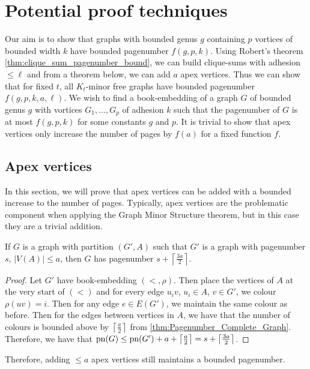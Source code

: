 
\chapter{Potential proof techniques}\label{chap:Proving_The_Theorem}
Our aim is to show that graphs with bounded genus \(g\) containing \(p\) vortices of bounded width \(k\) have bounded pagenumber \(f(g, p, k)\).
Using Robert's theorem \cref{thm:clique_sum_pagenumber_bound}, we can build clique-sums with adhesion \(\leq \ell\) and from a theorem below, we can add \(a\) apex vertices. 
Thus we can show that for fixed \(t\), all \(K_t\)-minor free graphs have bounded pagenumber \(f(g, p, k, a, \ell)\). 
We wish to find a book-embedding of a graph \(G\) of bounded genus \(g\) with vortices \(G_1, \ldots, G_p\) of adhesion \(k\) such that the pagenumber of \(G\) is at most \(f(g, p, k)\) for some constants \(g\) and \(p\). It is trivial to show that apex vertices only increase the number of pages by \(f(a)\) for a fixed function \(f\). 
\section{Apex vertices}
In this section, we will prove that apex vertices can be added with a bounded increase to the number of pages. Typically, apex vertices are the problematic component when applying the Graph Minor Structure theorem, but in this case they are a trivial addition.
\begin{theorem}
	If \(G\) is a graph with partition \((G', A)\) such that \(G'\) is a graph with pagenumber \(s\), \(|V(A)| \leq a\), then \(G\) has pagenumber \(s + \left\lceil \frac{3a}{2}\right\rceil\). 
\end{theorem}
\begin{proof}
	Let \(G'\) have book-embedding \((<, \rho)\). Then place the vertices of \(A\) at the very start of \((<)\) and for every edge \(u_i v \), \(u_i \in A\), \(v \in G'\), we colour \(\rho(uv) = i\). Then for any edge \(e \in E(G')\), we maintain the same colour as before. Then for the edges between vertices in \(A\), we have that the number of colours is bounded above by \(\left\lceil \frac{a}{2} \right\rceil\) from \cref{thm:Pagenumber_Complete_Graph}. Therefore, we have that \(\text{pn}(G) \leq \text{pn}(G') + a + \left\lceil \frac{a}{2} \right\rceil =s + \left\lceil \frac{3a}{2}\right\rceil\). 
\end{proof}

Therefore, adding \( \leq a\) apex vertices still maintains a bounded pagenumber.

